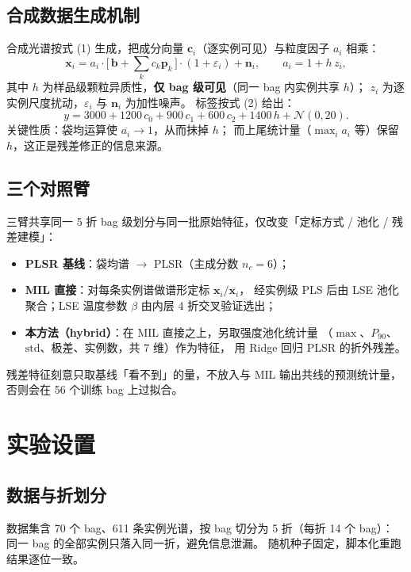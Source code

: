 \documentclass[11pt,a4paper,UTF8]{ctexart}
\begin{document}
\subsection{合成数据生成机制}
合成光谱按式 (1) 生成，把成分向量 $\mathbf{c}_i$（逐实例可见）与粒度因子 $a_i$ 相乘：
\begin{equation}
  \mathbf{x}_i = a_i \cdot \bigl[\, \mathbf{b} + \sum_k c_k \mathbf{p}_k \,\bigr] \cdot (1+\varepsilon_i) + \mathbf{n}_i,
  \qquad a_i = 1 + h\,z_i,
\end{equation}
其中 $h$ 为样品级颗粒异质性，\textbf{仅 bag 级可见}（同一 bag 内实例共享 $h$）；
$z_i$ 为逐实例尺度扰动，$\varepsilon_i$ 与 $\mathbf{n}_i$ 为加性噪声。
标签按式 (2) 给出：
\begin{equation}
  y = 3000 + 1200\,c_0 + 900\,c_1 + 600\,c_2 + 1400\,h + \mathcal{N}(0, 20).
\end{equation}
关键性质：袋均运算使 $\overline{a_i}\to 1$，从而抹掉 $h$；
而上尾统计量（$\max_i a_i$ 等）保留 $h$，这正是残差修正的信息来源。

\subsection{三个对照臂}
三臂共享同一 5 折 bag 级划分与同一批原始特征，仅改变「定标方式 / 池化 / 残差建模」：
\begin{itemize}
  \item \textbf{PLSR 基线}：袋均谱 $\to$ PLSR（主成分数 $n_c=6$）；
  \item \textbf{MIL 直接}：对每条实例谱做谱形定标 $\mathbf{x}_i/\overline{\mathbf{x}_i}$，
        经实例级 PLS 后由 LSE 池化聚合；LSE 温度参数 $\beta$ 由内层 4 折交叉验证选出；
  \item \textbf{本方法（hybrid）}：在 MIL 直接之上，另取强度池化统计量
       （$\max$、$P_{90}$、$\mathrm{std}$、极差、实例数，共 7 维）作为特征，
        用 Ridge 回归 PLSR 的折外残差。
\end{itemize}
残差特征刻意只取基线「看不到」的量，不放入与 MIL 输出共线的预测统计量，
否则会在 56 个训练 bag 上过拟合。

\section{实验设置}
\subsection{数据与折划分}
数据集含 70 个 bag、611 条实例光谱，按 bag 切分为 5 折（每折 14 个 bag）：
同一 bag 的全部实例只落入同一折，避免信息泄漏。
随机种子固定，脚本化重跑结果逐位一致。
\end{document}
